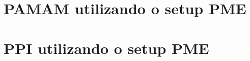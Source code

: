\documentclass[
	12pt,				%
	openright,			%
	twoside,			%
	a4paper,			%
	english,			%
	french,				%
	spanish,			%
	brazil				%
	]{abntex2}
\begin{document}






\postextual

\makeatletter
\renewcommand\@biblabel[1]{#1. }
\makeatother

%




\begin{apendicesenv}

\partapendices

\chapter{PAMAM utilizando o setup PME} \label{PAMAMap}



\chapter{PPI utilizando o setup PME} \label{PPIap}





\end{apendicesenv}








\printindex
\end{document}
